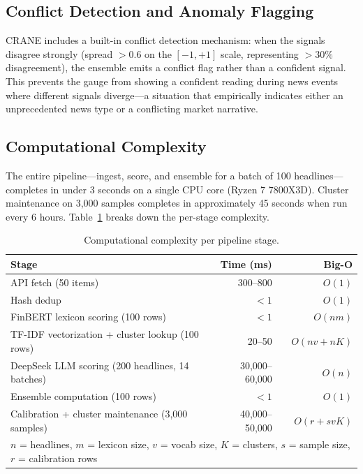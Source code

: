 \subsection{Conflict Detection and Anomaly Flagging}

CRANE includes a built-in conflict detection mechanism: when the signals disagree strongly (spread $> 0.6$ on the $[-1,+1]$ scale, representing $>30\%$ disagreement), the ensemble emits a conflict flag rather than a confident signal. This prevents the gauge from showing a confident reading during news events where different signals diverge---a situation that empirically indicates either an unprecedented news type or a conflicting market narrative.

\subsection{Computational Complexity}

The entire pipeline---ingest, score, and ensemble for a batch of 100 headlines---completes in under 3 seconds on a single CPU core (Ryzen 7 7800X3D). Cluster maintenance on 3,000 samples completes in approximately 45 seconds when run every 6 hours. Table~\ref{tab:complexity} breaks down the per-stage complexity.

\begin{table}[ht]
\centering
\caption{Computational complexity per pipeline stage.}
\label{tab:complexity}
\begin{tabular}{lrr}
\toprule
\textbf{Stage} & \textbf{Time (ms)} & \textbf{Big-O} \\
\midrule
API fetch (50 items) & 300--800 & $O(1)$ \\
Hash dedup & $< 1$ & $O(1)$ \\
FinBERT lexicon scoring (100 rows) & $< 1$ & $O(nm)$ \\
TF-IDF vectorization + cluster lookup (100 rows) & 20--50 & $O(nv + nK)$ \\
DeepSeek LLM scoring (200 headlines, 14 batches) & 30,000--60,000 & $O(n)$ \\
Ensemble computation (100 rows) & $< 1$ & $O(1)$ \\
Calibration + cluster maintenance (3,000 samples) & 40,000--50,000 & $O(r + svK)$ \\
\bottomrule
\multicolumn{3}{l}{\footnotesize $n$ = headlines, $m$ = lexicon size, $v$ = vocab size, $K$ = clusters, $s$ = sample size, $r$ = calibration rows} \\
\end{tabular}
\end{table}
